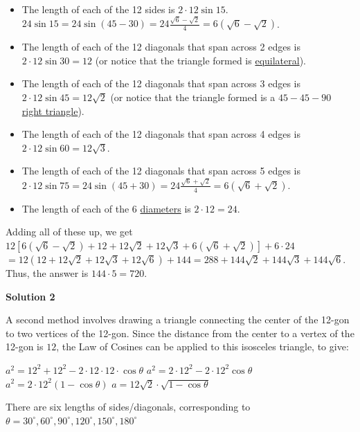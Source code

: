 \begin{enumerate}
 
            \begin{itemize}
        \item The length of each of the 12 sides is $2 \cdot 12\sin 15$. $24\sin 15 = 24\sin (45 - 30) = 24\frac{\sqrt{6} - \sqrt{2}}{4} = 6(\sqrt{6} - \sqrt{2})$.
        \item The length of each of the 12 diagonals that span across 2 edges is $2 \cdot 12\sin 30 = 12$ (or notice that the triangle formed is \href{https://artofproblemsolving.com/wiki/index.php?title=Equilateral\_triangle}{equilateral}).
        \item The length of each of the 12 diagonals that span across 3 edges is $2 \cdot 12\sin 45 = 12\sqrt{2}$ (or notice that the triangle formed is a $45 - 45 - 90$ \href{https://artofproblemsolving.com/wiki/index.php?title=Right\_triangle}{right triangle}).
        \item The length of each of the 12 diagonals that span across 4 edges is $2 \cdot 12\sin 60 = 12\sqrt{3}$.
        \item The length of each of the 12 diagonals that span across 5 edges is $2 \cdot 12\sin 75 = 24\sin (45 + 30) = 24\frac{\sqrt{6}+\sqrt{2}}{4} = 6(\sqrt{6}+\sqrt{2})$.
        \item The length of each of the 6 \href{https://artofproblemsolving.com/wiki/index.php?title=Diameter}{diameters} is $2 \cdot 12 = 24$.
            \end{itemize}
            Adding all of these up, we get $12[6(\sqrt{6} - \sqrt{2}) + 12 + 12\sqrt{2} + 12\sqrt{3} + 6(\sqrt{6}+\sqrt{2})] + 6 \cdot 24$
$= 12(12 + 12\sqrt{2} + 12\sqrt{3} + 12\sqrt{6}) + 144 = 288 + 144\sqrt{2} + 144\sqrt{3} + 144\sqrt{6}$. Thus, the answer is $144 \cdot 5 = \boxed{720}$.

 



\textbf{Solution 2}

A second method involves drawing a triangle connecting the center of the 12-gon to two vertices of the 12-gon.  Since the distance from the center to a vertex of the 12-gon is $12$, the Law of Cosines can be applied to this isosceles triangle, to give:

 $a^2 = 12^2 + 12^2 - 2\cdot 12\cdot 12\cdot \cos \theta$
$a^2 = 2\cdot 12^2 - 2\cdot 12^2 \cos \theta$
$a^2 = 2\cdot 12^2 (1 -  \cos \theta)$
$a = 12\sqrt{2} \cdot \sqrt{1 - \cos \theta}$

 There are six lengths of sides/diagonals, corresponding to $\theta = {30^{\circ}, 60^{\circ}, 90^{\circ}, 120^{\circ}, 150^{\circ}, 180^{\circ}}$


\end{enumerate}
